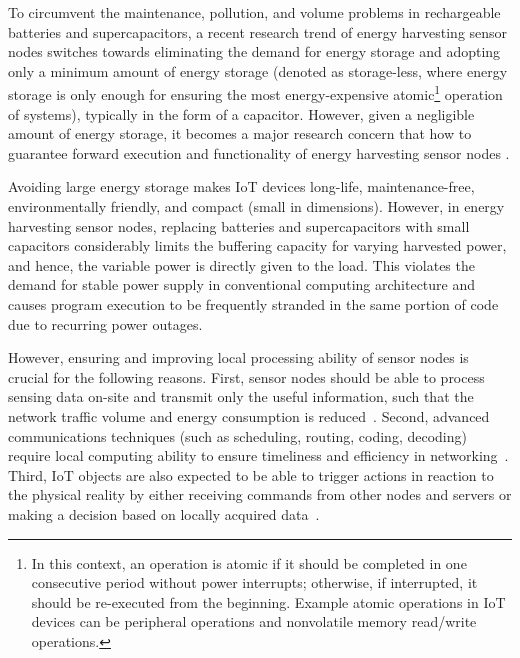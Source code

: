 To circumvent the maintenance, pollution, and volume problems in rechargeable batteries and supercapacitors, a recent research trend of energy harvesting sensor nodes switches towards eliminating the demand for energy storage and adopting only a minimum amount of energy storage (denoted as storage-less, where energy storage is only enough for ensuring the most energy-expensive atomic\footnote{In this context, an operation is atomic if it should be completed in one consecutive period without power interrupts; otherwise, if interrupted, it should be re-executed from the beginning. Example atomic operations in IoT devices can be peripheral operations and nonvolatile memory read/write operations.} operation of systems), typically in the form of a capacitor. However, given a negligible amount of energy storage, it becomes a major research concern that how to guarantee forward execution and functionality of energy harvesting sensor nodes .

Avoiding large energy storage makes IoT devices long-life, maintenance-free, environmentally friendly, and compact (small in dimensions). However, in energy harvesting sensor nodes, replacing batteries and supercapacitors with small capacitors considerably limits the buffering capacity for varying harvested power, and hence, the variable power is directly given to the load. This violates the demand for stable power supply in conventional computing architecture and causes program execution to be frequently stranded in the same portion of code due to recurring power outages. 


However, ensuring and improving local processing ability of sensor nodes is crucial for the following reasons. First, sensor nodes should be able to process sensing data on-site and transmit only the useful information, such that the network traffic volume and energy consumption is reduced~\cite{shi2016edge}. Second, advanced communications techniques (such as scheduling, routing, coding, decoding) require local computing ability to ensure timeliness and efficiency in networking~\cite{akyildiz2002wireless}. Third, IoT objects are also expected to be able to trigger actions in reaction to the physical reality by either receiving commands from other nodes and servers or making a decision based on locally acquired data~\cite{miorandi2012internet}. 

